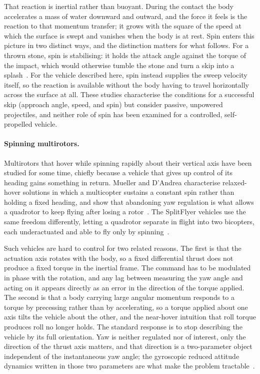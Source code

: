 That reaction is inertial rather than buoyant.  During the contact the body
accelerates a mass of water downward and outward, and the force it feels is the
reaction to that momentum transfer; it grows with the square of the speed at
which the surface is swept and vanishes when the body is at rest.  Spin enters
this picture in two distinct ways, and the distinction matters for what
follows.  For a thrown stone, spin is stabilising: it holds the attack angle
against the torque of the impact, which would otherwise tumble the stone and
turn a skip into a splash~\cite{bocquet2003physics}.  For the vehicle described
here, spin instead supplies the sweep velocity itself, so the reaction is
available without the body having to travel horizontally across the surface at
all.  These studies characterise the conditions for a successful skip (approach
angle, speed, and spin) but consider passive, unpowered projectiles, and
neither role of spin has been examined for a controlled, self-propelled
vehicle.

\paragraph{Spinning multirotors.}
Multirotors that hover while spinning rapidly about their vertical axis have
been studied for some time, chiefly because a vehicle that gives up control of
its heading gains something in return.  Mueller and D'Andrea characterise
relaxed-hover solutions in which a multicopter sustains a constant spin rather
than holding a fixed heading, and show that abandoning yaw regulation is what
allows a quadrotor to keep flying after losing a
rotor~\cite{mueller2016relaxed}.  The SplitFlyer vehicles use the same freedom
differently, letting a quadrotor separate in flight into two bicopters, each
underactuated and able to fly only by
spinning~\cite{bai2020splitflyer,bai2022splitflyerair}.

Such vehicles are hard to control for two related reasons.  The first is that
the actuation axis rotates with the body, so a fixed differential thrust does
not produce a fixed torque in the inertial frame.  The command has to be
modulated in phase with the rotation, and any lag between measuring the yaw
angle and acting on it appears directly as an error in the direction of the
torque applied.  The second is that a body carrying large angular momentum
responds to a torque by precessing rather than by accelerating, so a torque
applied about one axis tilts the vehicle about the other, and the near-hover
intuition that roll torque produces roll no longer holds.  The standard
response is to stop describing the vehicle by its full orientation.  Yaw is
neither regulated nor of interest, only the direction of the thrust axis
matters, and that direction is a two-parameter object independent of the
instantaneous yaw angle; the gyroscopic reduced attitude dynamics written in
those two parameters are what make the problem
tractable~\cite{bai2022splitflyerair}.

